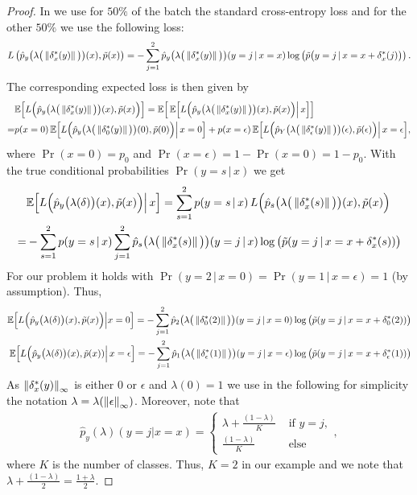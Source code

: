 \begin{proof}
	In \ConfTrain we use for $50\%$ of the batch the standard cross-entropy loss and for the other $50\%$ we use the following loss:
	\begin{align*}
		L\left(\hat{p}_y\big(\lambda\big(\left\|\delta^*_x(y)\right\|\big)\big)(x),\tilde{p}(x)\right)= - \sum_{j=1}^2 \hat{p}_y\big(\lambda\big(\left\|\delta^*_x(y)\right\|\big)\big)(y=j\,|\,x=x) \log\left(\tilde{p}\big(y=j\,|\,x=x+\delta^*_x(j)\big)\right).
	\end{align*}
	The corresponding expected loss is then given by
	\begin{align*}
		&\mathbb{E}\Big[ L\Big(\hat{p}_y\big(\lambda\big(\left\|\delta^*_x(y)\right\|\big)\big)(x),\tilde{p}(x)\Big)\Big]
		=\mathbb{E}\Big[\,\mathbb{E}\Big[ L\Big(\hat{p}_y\big(\lambda\big(\left\|\delta^*_x(y)\right\|\big)\big)(x),\tilde{p}(x)\Big) \Big| \,x\Big]\Big] \\
		=&p(x=0)\,\mathbb{E}\Big[ L\Big(\hat{p}_y\big(\lambda\big(\left\|\delta^*_0(y)\right\|\big)\big)(0),\tilde{p}(0)\Big)\Big|\,x=0\Big] + p(x=\epsilon)\,\mathbb{E}\Big[ L\Big(\hat{p}_Y\big(\lambda\big(\left\|\delta^*_\epsilon(y)\right\|\big)\big)(\epsilon),\tilde{p}(\epsilon)\Big)\Big|\,x=\epsilon\Big],
	\end{align*}
	where $\Pr(x=0)=p_0$ and $\Pr(x=\epsilon)=1-\Pr(x=0)=1-p_0$. With the true conditional probabilities $\Pr(y=s\,|\,x)$ we get 
	\begin{align*}
		&\mathbb{E}\Big[ L\Big(\hat{p}_y\big(\lambda(\delta)\big)(x),\tilde{p}(x)\Big)\Big|\,x\Big]
		=\sum_{s=1}^2 p(y=s\,|\,x) \, L\Big(\hat{p}_s\big(\lambda\big(\left\|\delta^*_x(s)\right\|\big)\big)(x),\tilde{p}(x)\Big)\\
		=&- \sum_{s=1}^2 p(y=s\,|\,x) \sum_{j=1}^2 \hat{p}_s\big(\lambda\big(\left\|\delta^*_x(s)\right\|\big)\big)(y=j\,|\,x) \log\big(\tilde{p}(y=j\,|\,x=x+\delta^*_x(s))\big)
	\end{align*}
	For our problem it holds with $\Pr(y=2\,|\,x=0)=\Pr(y=1\,|\,x=\epsilon) =1$ (by assumption). Thus,
	\begin{align*}
		\mathbb{E}\Big[ L\Big(\hat{p}_y\big(\lambda(\delta)\big)(x),\tilde{p}(x)\Big)\Big|x=0\Big]=-\sum_{j=1}^2 \hat{p}_2\big(\lambda\big(\left\|\delta^*_0(2)\right\|\big)\big)(y=j\,|\,x=0) \log\big(\tilde{p}(y=j\,|\,x=x+\delta^*_0(2))\big)\\
		\mathbb{E}\Big[ L\Big(\hat{p}_y\big(\lambda(\delta)\big)(x),\tilde{p}(x))\Big|\,x=\epsilon\Big]=-\sum_{j=1}^2 \hat{p}_1\big(\lambda\big(\left\|\delta^*_\epsilon(1)\right\|\big)\big)(y=j\,|\,x=\epsilon) \log\big(\tilde{p}(y=j\,|\,x=x+\delta^*_\epsilon(1))\big)
	\end{align*}
	As $\left\|\delta^*_x(y)\right\|_\infty$ is either $0$ or $\epsilon$ and $\lambda(0)=1$ we use in the following for simplicity the notation $\lambda=\lambda(\left\|\epsilon\right\|_\infty)$. Moreover, note that 
	\begin{align*}
		\hat{p}_y(\lambda)(y=j|x=x)=\begin{cases} \lambda + \frac{(1-\lambda)}{K} & \textrm{ if } y = j,\\ \frac{(1-\lambda)}{K} & \textrm{ else }\end{cases},
	\end{align*}
	where $K$ is the number of classes. Thus, $K=2$ in our example and we note that $\lambda + \frac{(1-\lambda)}{2}=\frac{1+\lambda}{2}$.
	

\end{proof}
